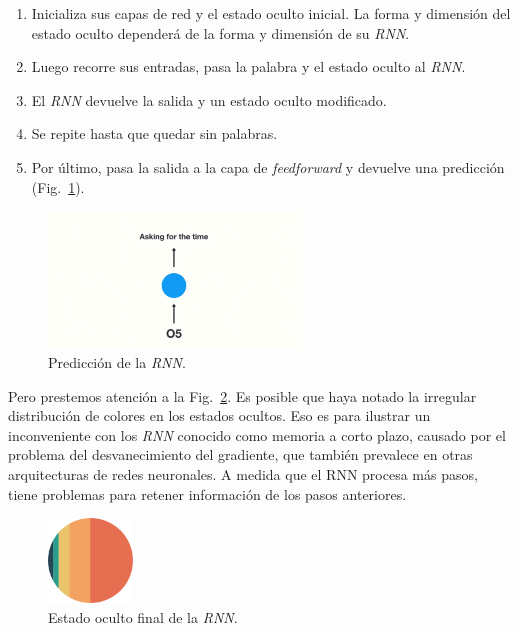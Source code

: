 \documentclass[a4paper,12pt]{article}
\begin{document}
\begin{enumerate}[noitemsep, topsep=2pt]
	\item Inicializa sus capas de red y el estado oculto inicial. La forma y dimensión del estado oculto dependerá de la forma y dimensión de su \textit{RNN}.
	\item Luego recorre sus entradas, pasa la palabra y el estado oculto al \textit{RNN}.
	\item El \textit{RNN} devuelve la salida y un estado oculto modificado.
	\item Se repite hasta que quedar sin palabras.
	\item Por último, pasa la salida a la capa de \textit{feedforward} y devuelve una predicción (Fig.~\ref{fig:rnnvanishing2}).
\end{enumerate}

\begin{figure}[H]
	\begin{center}				
	\includegraphics[width=0.6\textwidth]{vanishing2.png}
  	\caption{Predicción de la \textit{RNN}.}
  	\label{fig:rnnvanishing2}
  	\end{center}
\end{figure}

Pero prestemos atención a la Fig.~\ref{fig:rnnvanishing3}. Es posible que haya notado la irregular distribución de colores en los estados ocultos. Eso es para ilustrar un inconveniente con los \textit{RNN} conocido como memoria a corto plazo, causado por el problema del desvanecimiento del gradiente, que también prevalece en otras arquitecturas de redes neuronales. A medida que el RNN procesa más pasos, tiene problemas para retener información de los pasos anteriores. 

\begin{figure}[H]
	\begin{center}				
	\includegraphics[width=0.2\textwidth]{vanishin3.png}
  	\caption{Estado oculto final de la \textit{RNN}.}
  	\label{fig:rnnvanishing3}
  	\end{center}
\end{figure}
\end{document}
